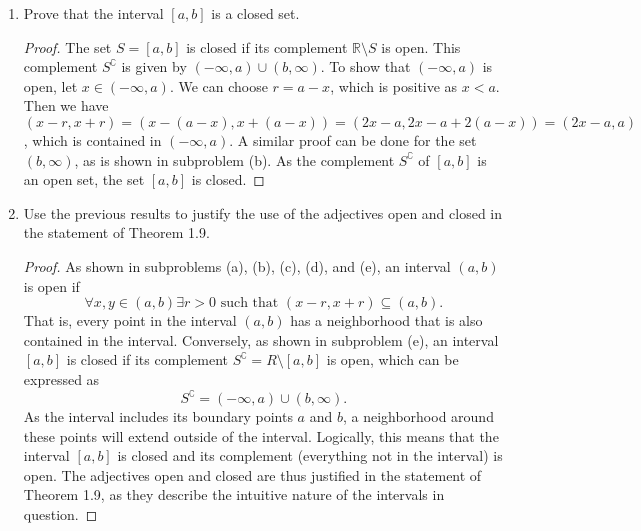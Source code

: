 \documentclass[12pt]{article}
\begin{document}
\begin{enumerate}[label=(\alph*)]
\begin{proof}
      \noindent The same logic holds for the intersection of two open sets, $x \in S_1 \cap S_2$. Let $r_1 > 0$ such that $(x - r_1, x + r_1) \subseteq S_1$ and $r_2 > 0$ such that $(x - r_2, x + r_2) \subseteq S_2$. Let $r = \min(r_1, r_2) > 0$. Then we have $(x - r, x + r) \subseteq S_1 \cap S_2$, proving that the intersection of two open sets is an open set.
    \end{proof}
    
    \newpage
    \item Prove that the interval $[a,b]$ is a closed set.
    \begin{proof}
      The set $S = [a, b]$ is closed if its complement $\mathbb{R} \setminus S$ is open. This complement $S^\complement$ is given by $(-\infty, a) \cup (b, \infty)$. To show that $(-\infty, a)$ is open, let $x \in (-\infty, a)$. We can choose $r = a - x$, which is positive as $x < a$. Then we have $(x - r, x + r) = (x - (a - x), x + (a - x)) = (2x - a, 2x - a + 2(a - x)) = (2x - a, a)$, which is contained in $(-\infty, a)$. A similar proof can be done for the set $(b, \infty)$, as is shown in subproblem (b). As the complement $S^\complement$  of $[a, b]$ is an open set, the set $[a, b]$ is closed.
    \end{proof}

    \item Use the previous results to justify the use of the adjectives open and closed in the statement of Theorem 1.9.
    \begin{proof}
      As shown in subproblems (a), (b), (c), (d), and (e), an interval $(a, b)$ is open if 
      \[
        \forall x, y \in (a, b) \exists r > 0 \text{ such that } (x - r, x + r) \subseteq (a, b).
      \]
      That is, every point in the interval $(a, b)$ has a neighborhood that is also contained in the interval. Conversely, as shown in subproblem (e), an interval $[a, b]$ is closed if its complement $S^\complement = R \setminus [a, b]$ is open, which can be expressed as
      \[
        S^\complement = (-\infty, a) \cup (b, \infty).
      \]
      As the interval includes its boundary points $a$ and $b$, a neighborhood around these points will extend outside of the interval. Logically, this means that the interval $[a, b]$ is closed and its complement (everything not in the interval) is open. The adjectives open and closed are thus justified in the statement of Theorem 1.9, as they describe the intuitive nature of the intervals in question.
    \end{proof}

  \end{enumerate}
  \newpage
\end{document}
